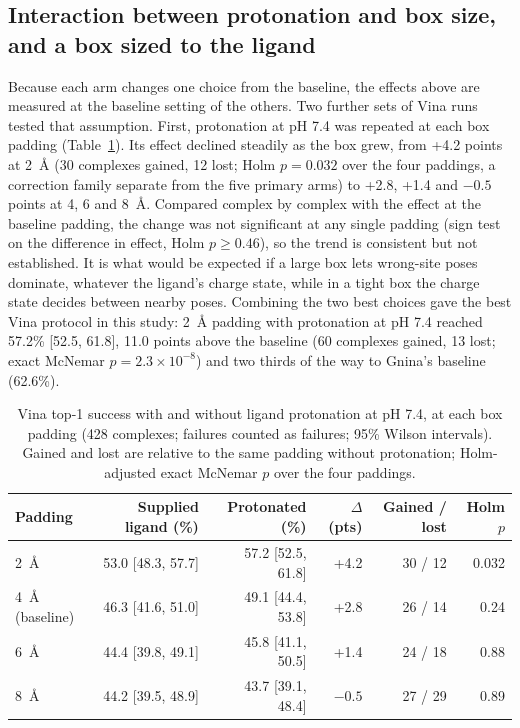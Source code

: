 \subsection{Interaction between protonation and box size, and a box sized to the ligand}
\label{sec:interaction}

Because each arm changes one choice from the baseline, the effects above are measured at
the baseline setting of the others. Two further sets of Vina runs tested that assumption.
First, protonation at pH 7.4 was repeated at each box padding (Table~\ref{tab:interaction}).
Its effect declined steadily as the box grew, from +4.2 points at \SI{2}{\angstrom} (30
complexes gained, 12 lost; Holm $p = 0.032$ over the four paddings, a correction family
separate from the five primary arms) to +2.8, +1.4 and
$-0.5$ points at 4, 6 and \SI{8}{\angstrom}. Compared complex by complex with the effect at
the baseline padding, the change was not significant at any single padding (sign test on
the difference in effect, Holm $p \ge 0.46$), so the trend is consistent but not
established. It is what would be expected if a large box lets wrong-site poses dominate,
whatever the ligand's charge state, while in a tight box the charge state decides between
nearby poses. Combining the two best choices gave the best Vina protocol in this study:
\SI{2}{\angstrom} padding with protonation at pH 7.4 reached 57.2\% [52.5, 61.8], 11.0
points above the baseline (60 complexes gained, 13 lost; exact McNemar
$p = 2.3 \times 10^{-8}$) and two thirds of the way to Gnina's baseline (62.6\%).

\begin{table}[h]
  \centering
  \caption{Vina top-1 success with and without ligand protonation at pH 7.4, at each box
    padding (428 complexes; failures counted as failures; 95\% Wilson intervals). Gained
    and lost are relative to the same padding without protonation; Holm-adjusted exact
    McNemar $p$ over the four paddings.}
  \label{tab:interaction}
  \begin{tabular}{lrrrrr}
    \toprule
    Padding & Supplied ligand (\%) & Protonated (\%) & $\Delta$ (pts) & Gained / lost & Holm $p$ \\
    \midrule
    \SI{2}{\angstrom} & 53.0 [48.3, 57.7] & 57.2 [52.5, 61.8] & +4.2 & 30 / 12 & 0.032 \\
    \SI{4}{\angstrom} (baseline) & 46.3 [41.6, 51.0] & 49.1 [44.4, 53.8] & +2.8 & 26 / 14 & 0.24 \\
    \SI{6}{\angstrom} & 44.4 [39.8, 49.1] & 45.8 [41.1, 50.5] & +1.4 & 24 / 18 & 0.88 \\
    \SI{8}{\angstrom} & 44.2 [39.5, 48.9] & 43.7 [39.1, 48.4] & $-0.5$ & 27 / 29 & 0.89 \\
    \bottomrule
  \end{tabular}
\end{table}

